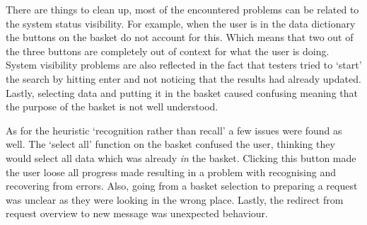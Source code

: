 There are things to clean up, most of the encountered problems can be related to the system status visibility.
For example, when the user is in the data dictionary the buttons on the basket do not account for this.
Which means that two out of the three buttons are completely out of context for what the user is doing.
System visibility problems are also reflected in the fact that testers tried to `start' the search by hitting enter and not noticing that the results had already updated.
Lastly, selecting data and putting it in the basket caused confusing meaning that the purpose of the basket is not well understood.

As for the heuristic `recognition rather than recall' a few issues were found as well.
The `select all' function on the basket confused the user, thinking they would select all data which was already \emph{in} the basket.
Clicking this button made the user loose all progress made resulting in a problem with recognising and recovering from errors.
Also, going from a basket selection to preparing a request was unclear as they were looking in the wrong place.
Lastly, the redirect from request overview to new message was unexpected behaviour.